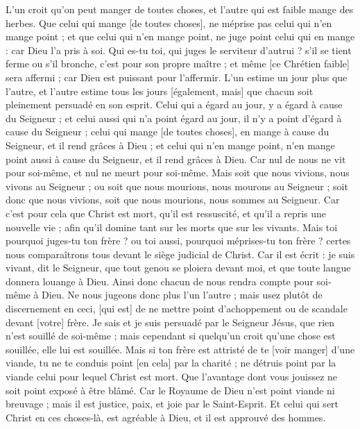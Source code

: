 \begin{multicols}{2}
L'un croit qu'on peut manger de toutes choses, et l'autre qui est faible mange des herbes.
Que celui qui mange [de toutes choses], ne méprise pas celui qui n'en mange point ; et que celui qui n'en mange point, ne juge point celui qui en mange : car Dieu l'a pris à soi.
Qui es-tu toi, qui juges le serviteur d'autrui ? s'il se tient ferme ou s'il bronche, c'est pour son propre maître ; et même [ce Chrétien faible] sera affermi ; car Dieu est puissant pour l'affermir.
L'un estime un jour plus que l'autre, et l'autre estime tous les jours [également, mais] que chacun soit pleinement persuadé en son esprit.
Celui qui a égard au jour, y a égard à cause du Seigneur ; et celui aussi qui n'a point égard au jour, il n'y a point d'égard à cause du Seigneur ; celui qui mange [de toutes choses], en mange à cause du Seigneur, et il rend grâces à Dieu ; et celui qui n'en mange point, n'en mange point aussi à cause du Seigneur, et il rend grâces à Dieu.
Car nul de nous ne vit pour soi-même, et nul ne meurt pour soi-même.
Mais soit que nous vivions, nous vivons au Seigneur ; ou soit que nous mourions, nous mourons au Seigneur ; soit donc que nous vivions, soit que nous mourions, nous sommes au Seigneur.
Car c'est pour cela que Christ est mort, qu'il est ressuscité, et qu'il a repris une nouvelle vie ; afin qu'il domine tant sur les morts que sur les vivants.
Mais toi pourquoi juges-tu ton frère ? ou toi aussi, pourquoi méprises-tu ton frère ? certes nous comparaîtrons tous devant le siège judicial de Christ.
Car il est écrit : je suis vivant, dit le Seigneur, que tout genou se ploiera devant moi, et que toute langue donnera louange à Dieu.
Ainsi donc chacun de nous rendra compte pour soi-même à Dieu.
Ne nous jugeons donc plus l'un l'autre ; mais usez plutôt de discernement en ceci, [qui est] de ne mettre point d'achoppement ou de scandale devant [votre] frère.
Je sais et je suis persuadé par le Seigneur Jésus, que rien n'est souillé de soi-même ; mais cependant si quelqu'un croit qu'une chose est souillée, elle lui est souillée.
Mais si ton frère est attristé de te [voir manger] d'une viande, tu ne te conduis point [en cela] par la charité ; ne détruis point par la viande celui pour lequel Christ est mort.
Que l'avantage dont vous jouissez ne soit point exposé à être blâmé.
Car le Royaume de Dieu n'est point viande ni breuvage ; mais il est justice, paix, et joie par le Saint-Esprit.
Et celui qui sert Christ en ces choses-là, est agréable à Dieu, et il est approuvé des hommes.

\end{multicols}
